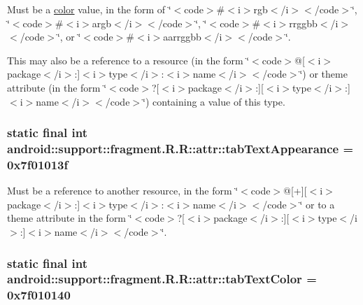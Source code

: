 Must be a \hyperlink{classandroid_1_1support_1_1fragment_1_1_r_1_1color}{color} value, in the form of \char`\"{}$<$code$>$\#$<$i$>$rgb$<$/i$>$$<$/code$>$\char`\"{}, \char`\"{}$<$code$>$\#$<$i$>$argb$<$/i$>$$<$/code$>$\char`\"{}, \char`\"{}$<$code$>$\#$<$i$>$rrggbb$<$/i$>$$<$/code$>$\char`\"{}, or \char`\"{}$<$code$>$\#$<$i$>$aarrggbb$<$/i$>$$<$/code$>$\char`\"{}. 

This may also be a reference to a resource (in the form \char`\"{}$<$code$>$@\mbox{[}$<$i$>$package$<$/i$>$:\mbox{]}$<$i$>$type$<$/i$>$:$<$i$>$name$<$/i$>$$<$/code$>$\char`\"{}) or theme attribute (in the form \char`\"{}$<$code$>$?\mbox{[}$<$i$>$package$<$/i$>$:\mbox{]}\mbox{[}$<$i$>$type$<$/i$>$:\mbox{]}$<$i$>$name$<$/i$>$$<$/code$>$\char`\"{}) containing a value of this type. \hypertarget{classandroid_1_1support_1_1fragment_1_1_r_1_1attr_045b60e2fc154b5d666b134df260057b}{
\subsubsection[{tabTextAppearance}]{\setlength{\rightskip}{0pt plus 5cm}static final int android::support::fragment.R.R::attr::tabTextAppearance = 0x7f01013f}}
\label{classandroid_1_1support_1_1fragment_1_1_r_1_1attr_045b60e2fc154b5d666b134df260057b}


Must be a reference to another resource, in the form \char`\"{}$<$code$>$@\mbox{[}+\mbox{]}\mbox{[}$<$i$>$package$<$/i$>$:\mbox{]}$<$i$>$type$<$/i$>$:$<$i$>$name$<$/i$>$$<$/code$>$\char`\"{} or to a theme attribute in the form \char`\"{}$<$code$>$?\mbox{[}$<$i$>$package$<$/i$>$:\mbox{]}\mbox{[}$<$i$>$type$<$/i$>$:\mbox{]}$<$i$>$name$<$/i$>$$<$/code$>$\char`\"{}. \hypertarget{classandroid_1_1support_1_1fragment_1_1_r_1_1attr_e7a372564f2c37b3a6fef45734446f53}{
\subsubsection[{tabTextColor}]{\setlength{\rightskip}{0pt plus 5cm}static final int android::support::fragment.R.R::attr::tabTextColor = 0x7f010140}}
\label{classandroid_1_1support_1_1fragment_1_1_r_1_1attr_e7a372564f2c37b3a6fef45734446f53}


